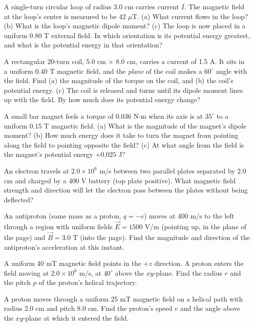 \documentclass[12pt]{article}
\begin{document}
\prob A single-turn circular loop of radius 3.0 cm carries current $I$.
The magnetic field at the loop's center is measured to be 42 $\mu$T.
(a) What current flows in the loop? (b) What is the loop's magnetic dipole
moment? (c) The loop is now placed in a uniform 0.80 T external field. In
which orientation is its potential energy greatest, and what is the
potential energy in that orientation?


\prob A rectangular 20-turn coil, 5.0 cm $\times$ 8.0 cm, carries a
current of 1.5 A. It sits in a uniform 0.40 T magnetic field, and the
\emph{plane} of the coil makes a $60^\circ$ angle with the field. Find (a)
the magnitude of the torque on the coil, and (b) the coil's potential
energy. (c) The coil is released and turns until its dipole moment lines
up with the field. By how much does its potential energy change?


\prob A small bar magnet feels a torque of 0.036 N$\cdot$m when its axis
is at $35^\circ$ to a uniform 0.15 T magnetic field. (a) What is the
magnitude of the magnet's dipole moment? (b) How much energy does it take
to turn the magnet from pointing along the field to pointing opposite the
field? (c) At what angle from the field is the magnet's potential energy
$+0.025$ J?


\prob An electron travels at $2.0\times10^6$ m/s between two parallel
plates separated by 2.0 cm and charged by a 400 V battery (top plate
positive). What magnetic field strength and direction will let the
electron pass between the plates without being deflected?


\prob An antiproton (same mass as a proton, $q=-e$) moves at 400 m/s to
the left through a region with uniform fields $\vec E=1500$ V/m (pointing
up, in the plane of the page) and $\vec B=3.0$ T (into the page). Find the
magnitude and direction of the antiproton's acceleration at this instant.


\prob A uniform 40 mT magnetic field points in the $+z$ direction. A
proton enters the field moving at $2.0\times10^6$ m/s, at $40^\circ$ above
the $xy$-plane. Find the radius $r$ and the pitch $p$ of the proton's
helical trajectory.


\prob A proton moves through a uniform 25 mT magnetic field on a helical
path with radius 2.0 cm and pitch 8.0 cm. Find the proton's speed $v$ and
the angle above the $xy$-plane at which it entered the field.
\end{document}
